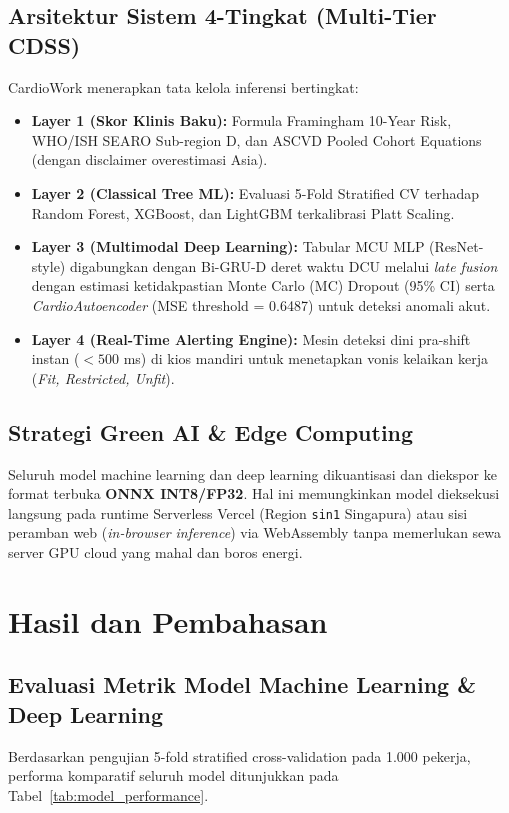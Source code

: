 \documentclass[a4paper,11pt]{article}
\begin{document}
\subsection{Arsitektur Sistem 4-Tingkat (Multi-Tier CDSS)}
CardioWork menerapkan tata kelola inferensi bertingkat:
\begin{itemize}[leftmargin=*]
    \item \textbf{Layer 1 (Skor Klinis Baku):} Formula Framingham 10-Year Risk, WHO/ISH SEARO Sub-region D, dan ASCVD Pooled Cohort Equations (dengan disclaimer overestimasi Asia).
    \item \textbf{Layer 2 (Classical Tree ML):} Evaluasi 5-Fold Stratified CV terhadap Random Forest, XGBoost, dan LightGBM terkalibrasi Platt Scaling.
    \item \textbf{Layer 3 (Multimodal Deep Learning):} Tabular MCU MLP (ResNet-style) digabungkan dengan Bi-GRU-D deret waktu DCU melalui \textit{late fusion} dengan estimasi ketidakpastian Monte Carlo (MC) Dropout (95\% CI) serta \textit{CardioAutoencoder} (MSE threshold = 0.6487) untuk deteksi anomali akut.
    \item \textbf{Layer 4 (Real-Time Alerting Engine):} Mesin deteksi dini pra-shift instan ($<500$ ms) di kios mandiri untuk menetapkan vonis kelaikan kerja (\textit{Fit, Restricted, Unfit}).
\end{itemize}

\subsection{Strategi Green AI \& Edge Computing}
Seluruh model machine learning dan deep learning dikuantisasi dan diekspor ke format terbuka \textbf{ONNX INT8/FP32}. Hal ini memungkinkan model dieksekusi langsung pada runtime Serverless Vercel (Region \texttt{sin1} Singapura) atau sisi peramban web (\textit{in-browser inference}) via WebAssembly tanpa memerlukan sewa server GPU cloud yang mahal dan boros energi.

\section{Hasil dan Pembahasan}

\subsection{Evaluasi Metrik Model Machine Learning \& Deep Learning}
Berdasarkan pengujian 5-fold stratified cross-validation pada 1.000 pekerja, performa komparatif seluruh model ditunjukkan pada Tabel~\ref{tab:model_performance}.
\end{document}
